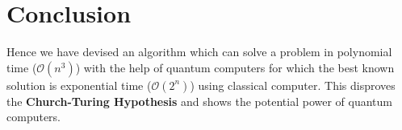 \documentclass[13pt]{article}
\begin{document}
\section{Conclusion}
Hence we have devised an algorithm which can solve a problem in polynomial time ($\mathcal{O}(n^3)$) with the help of quantum computers for which the best known solution is exponential time ($\mathcal{O}(2^n)$) using classical computer. This disproves the \textbf{Church-Turing Hypothesis} and shows the potential power of quantum computers.
\end{document}
